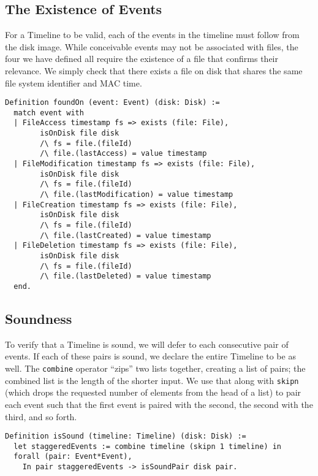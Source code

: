 \documentclass[nocopyrightspace]{sigplanconf}
\begin{document}
\subsection{The Existence of Events}

For a Timeline to be valid, each of the events in the timeline must follow
from the disk image. While conceivable events may not be associated with
files, the four we have defined all require the existence of a file that
confirms their relevance. We simply check that there exists a file on disk
that shares the same file system identifier and MAC time.

\begin{lstlisting}
Definition foundOn (event: Event) (disk: Disk) :=
  match event with
  | FileAccess timestamp fs => exists (file: File),
        isOnDisk file disk
        /\ fs = file.(fileId)
        /\ file.(lastAccess) = value timestamp
  | FileModification timestamp fs => exists (file: File),
        isOnDisk file disk
        /\ fs = file.(fileId)
        /\ file.(lastModification) = value timestamp
  | FileCreation timestamp fs => exists (file: File),
        isOnDisk file disk
        /\ fs = file.(fileId)
        /\ file.(lastCreated) = value timestamp
  | FileDeletion timestamp fs => exists (file: File),
        isOnDisk file disk
        /\ fs = file.(fileId)
        /\ file.(lastDeleted) = value timestamp
  end.
\end{lstlisting}

\subsection{Soundness}

To verify that a Timeline is sound, we will defer to each consecutive pair of
events. If each of these pairs is sound, we declare the entire Timeline to be
as well. The {\tt combine} operator ``zips'' two lists together, creating a
list of pairs; the combined list is the length of the shorter input. We use
that along with {\tt skipn} (which drops the requested number of elements from
the head of a list) to pair each event such that the first event is paired
with the second, the second with the third, and so forth.

\begin{lstlisting}
Definition isSound (timeline: Timeline) (disk: Disk) :=
  let staggeredEvents := combine timeline (skipn 1 timeline) in
  forall (pair: Event*Event),
    In pair staggeredEvents -> isSoundPair disk pair.
\end{lstlisting}
\end{document}
